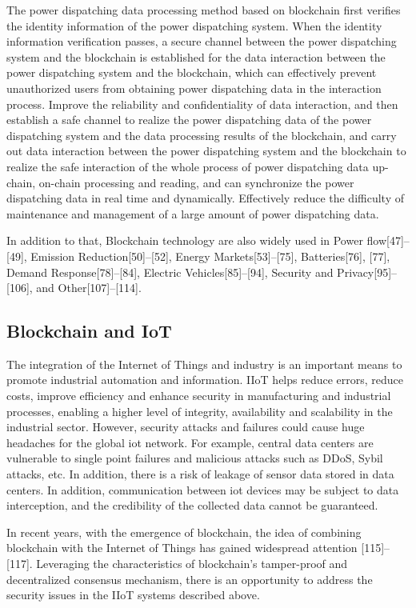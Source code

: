 \documentclass[lettersize,journal]{IEEEtran}
\begin{document}
The power dispatching data processing method based on blockchain first verifies the identity information of the power dispatching system. When the identity information verification passes, a secure channel between the power dispatching system and the blockchain is established for the data interaction between the power dispatching system and the blockchain, which can effectively prevent unauthorized users from obtaining power dispatching data in the interaction process. Improve the reliability and confidentiality of data interaction, and then establish a safe channel to realize the power dispatching data of the power dispatching system and the data processing results of the blockchain, and carry out data interaction between the power dispatching system and the blockchain to realize the safe interaction of the whole process of power dispatching data up-chain, on-chain processing and reading, and can synchronize the power dispatching data in real time and dynamically. Effectively reduce the difficulty of maintenance and management of a large amount of power dispatching data.

In addition to that, Blockchain technology are also widely used in Power flow[47]–[49], Emission Reduction[50]–[52], Energy Markets[53]–[75], Batteries[76], [77], Demand Response[78]–[84], Electric Vehicles[85]–[94], Security and Privacy[95]–[106], and Other[107]–[114].
\subsection{Blockchain and IoT}
The integration of the Internet of Things and industry is an important means to promote industrial automation and information. IIoT helps reduce errors, reduce costs, improve efficiency and enhance security in manufacturing and industrial processes, enabling a higher level of integrity, availability and scalability in the industrial sector. However, security attacks and failures could cause huge headaches for the global iot network. For example, central data centers are vulnerable to single point failures and malicious attacks such as DDoS, Sybil attacks, etc. In addition, there is a risk of leakage of sensor data stored in data centers. In addition, communication between iot devices may be subject to data interception, and the credibility of the collected data cannot be guaranteed.

In recent years, with the emergence of blockchain, the idea of combining blockchain with the Internet of Things has gained widespread attention [115]–[117]. Leveraging the characteristics of blockchain's tamper-proof and decentralized consensus mechanism, there is an opportunity to address the security issues in the IIoT systems described above.
\end{document}
